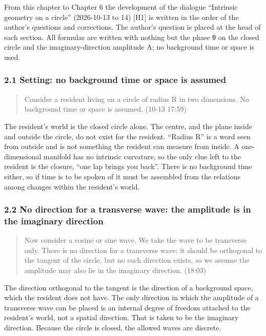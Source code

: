 \documentclass[
  a4paper,
]{article}
\begin{document}
From this chapter to Chapter 6 the development of the dialogue
``Intrinsic geometry on a circle'' (2026-10-13 to 14) {[}H1{]} is
written in the order of the author's questions and corrections. The
author's question is placed at the head of each section. All formulas
are written with nothing but the phase θ on the closed circle and the
imaginary-direction amplitude A; no background time or space is used.

\subsubsection{2.1 Setting: no background time or space is
assumed}\label{setting-no-background-time-or-space-is-assumed}

\begin{quote}
Consider a resident living on a circle of radius R in two dimensions. No
background time or space is assumed. (10-13 17:59)
\end{quote}

The resident's world is the closed circle alone. The centre, and the
plane inside and outside the circle, do not exist for the resident.
``Radius R'' is a word seen from outside and is not something the
resident can measure from inside. A one-dimensional manifold has no
intrinsic curvature, so the only clue left to the resident is the
closure, ``one lap brings you back''. There is no background time
either, so if time is to be spoken of it must be assembled from the
relations among changes within the resident's world.

\subsubsection{2.2 No direction for a transverse wave: the amplitude is
in the imaginary
direction}\label{no-direction-for-a-transverse-wave-the-amplitude-is-in-the-imaginary-direction}

\begin{quote}
Now consider a cosine or sine wave. We take the wave to be transverse
only. There is no direction for a transverse wave; it should be
orthogonal to the tangent of the circle, but no such direction exists,
so we assume the amplitude may also lie in the imaginary direction.
(18:03)
\end{quote}

The direction orthogonal to the tangent is the direction of a background
space, which the resident does not have. The only direction in which the
amplitude of a transverse wave can be placed is an internal degree of
freedom attached to the resident's world, not a spatial direction. That
is taken to be the imaginary direction. Because the circle is closed,
the allowed waves are discrete.
\end{document}
